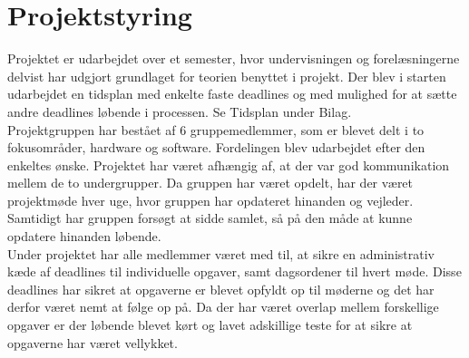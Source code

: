 \section{Projektstyring}
Projektet er udarbejdet over et semester, hvor undervisningen og forelæsningerne delvist har udgjort grundlaget for teorien benyttet i projekt. Der blev i starten udarbejdet en tidsplan med enkelte faste deadlines og med mulighed for at sætte andre deadlines løbende i processen. Se Tidsplan under Bilag.\\ 
Projektgruppen har bestået af 6 gruppemedlemmer, som er blevet delt i to fokusområder, hardware og software. Fordelingen blev udarbejdet efter den enkeltes ønske. Projektet  har  været afhængig af, at der var god kommunikation mellem de to undergrupper.
Da gruppen har været opdelt, har der været projektmøde hver uge, hvor gruppen har opdateret hinanden og vejleder. Samtidigt har gruppen forsøgt at sidde samlet, så på den måde at kunne opdatere hinanden løbende.\\
Under projektet har alle medlemmer været med til, at sikre en administrativ kæde af deadlines til individuelle opgaver, samt dagsordener til hvert møde. Disse deadlines har sikret at opgaverne er blevet opfyldt op til møderne og det har derfor været nemt at følge op på. Da der har været overlap mellem forskellige opgaver er der løbende blevet kørt og lavet adskillige teste for at sikre at opgaverne har været vellykket.  
 


